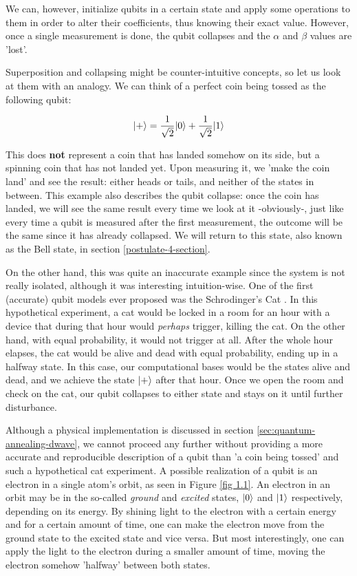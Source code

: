 We can, however, initialize qubits in a certain state and apply some operations to them in order to alter their coefficients, thus knowing their exact value. However, once a single measurement is done, the qubit collapses and the $\alpha$ and $\beta$ values are 'lost'.

Superposition and collapsing might be counter-intuitive concepts, so let us look at them with an analogy. We can think of a perfect coin being tossed as the following qubit:

$$ |+\rangle = \frac{1}{\sqrt{2}} |0\rangle + \frac{1}{\sqrt{2}} |1\rangle $$

This does \textbf{not} represent a coin that has landed somehow on its side, but a spinning coin that has not landed yet. Upon measuring it, we 'make the coin land' and see the result: either heads or tails, and neither of the states in between. This example also describes the qubit collapse: once the coin has landed, we will see the same result every time we look at it -obviously-, just like every time a qubit is measured after the first measurement, the outcome will be the same since it has already collapsed. We will return to this state, also known as the Bell state, in section \ref{postulate-4-section}.

On the other hand, this was quite an inaccurate example since the system is not really isolated, although it was interesting intuition-wise. One of the first (accurate) qubit models ever proposed was the Schrodinger's Cat \cite{Schrodinger1935} \cite{Trimmer1980}. In this hypothetical experiment, a cat would be locked in a room for an hour with a device that during that hour would \emph{perhaps} trigger, killing the cat. On the other hand, with equal probability, it would not trigger at all. After the whole hour elapses, the cat would be alive and dead with equal probability, ending up in a halfway state. In this case, our computational bases would be the states alive and dead, and we achieve the state $|+\rangle$ after that hour. Once we open the room and check on the cat, our qubit collapses to either state and stays on it until further disturbance.

Although a physical implementation is discussed in section \ref{sec:quantum-annealing-dwave}, we cannot proceed any further without providing a more accurate and reproducible description of a qubit than 'a coin being tossed' and such a hypothetical cat experiment. A possible realization of a qubit is an electron in a single atom's orbit, as seen in Figure \ref{fig 1.1}. An electron in an orbit may be in the so-called \emph{ground} and \emph{excited} states, $|0\rangle$ and $|1\rangle$ respectively, depending on its energy. By shining light to the electron with a certain energy and for a certain amount of time, one can make the electron move from the ground state to the excited state and vice versa. But most interestingly, one can apply the light to the electron during a smaller amount of time, moving the electron somehow 'halfway' between both states.

